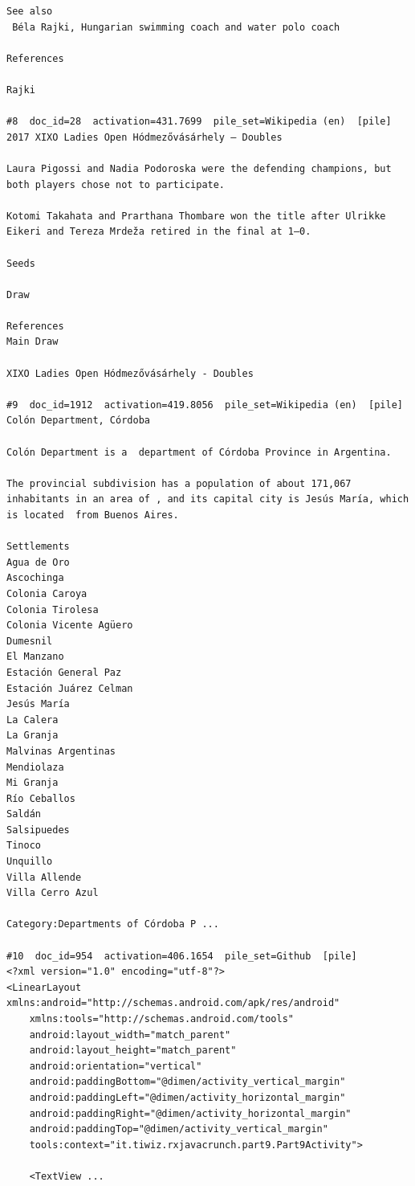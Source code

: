 \begin{verbatim}
See also
 Béla Rajki, Hungarian swimming coach and water polo coach

References

Rajki

#8  doc_id=28  activation=431.7699  pile_set=Wikipedia (en)  [pile]
2017 XIXO Ladies Open Hódmezővásárhely – Doubles

Laura Pigossi and Nadia Podoroska were the defending champions, but both players chose not to participate.

Kotomi Takahata and Prarthana Thombare won the title after Ulrikke Eikeri and Tereza Mrdeža retired in the final at 1–0.

Seeds

Draw

References
Main Draw

XIXO Ladies Open Hódmezővásárhely - Doubles

#9  doc_id=1912  activation=419.8056  pile_set=Wikipedia (en)  [pile]
Colón Department, Córdoba

Colón Department is a  department of Córdoba Province in Argentina.

The provincial subdivision has a population of about 171,067 inhabitants in an area of , and its capital city is Jesús María, which is located  from Buenos Aires.

Settlements
Agua de Oro
Ascochinga
Colonia Caroya
Colonia Tirolesa
Colonia Vicente Agüero
Dumesnil
El Manzano
Estación General Paz
Estación Juárez Celman
Jesús María
La Calera
La Granja
Malvinas Argentinas
Mendiolaza
Mi Granja
Río Ceballos
Saldán
Salsipuedes
Tinoco
Unquillo
Villa Allende
Villa Cerro Azul

Category:Departments of Córdoba P ...

#10  doc_id=954  activation=406.1654  pile_set=Github  [pile]
<?xml version="1.0" encoding="utf-8"?>
<LinearLayout xmlns:android="http://schemas.android.com/apk/res/android"
    xmlns:tools="http://schemas.android.com/tools"
    android:layout_width="match_parent"
    android:layout_height="match_parent"
    android:orientation="vertical"
    android:paddingBottom="@dimen/activity_vertical_margin"
    android:paddingLeft="@dimen/activity_horizontal_margin"
    android:paddingRight="@dimen/activity_horizontal_margin"
    android:paddingTop="@dimen/activity_vertical_margin"
    tools:context="it.tiwiz.rxjavacrunch.part9.Part9Activity">

    <TextView ...

\end{verbatim}

